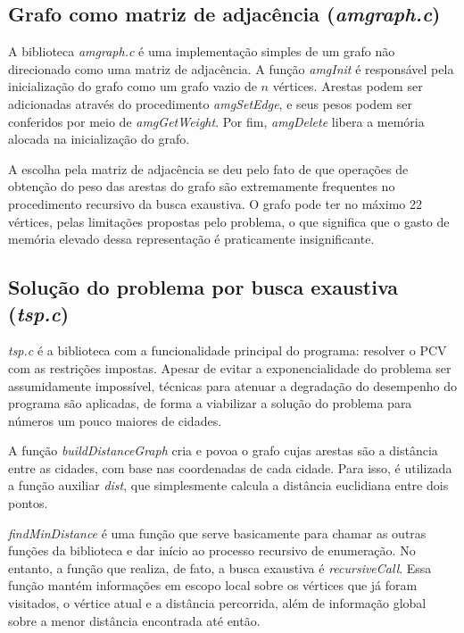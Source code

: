 \documentclass[10pt,a4paper]{article}
\numberwithin{equation}{section}
\begin{document}
\subsection{Grafo como matriz de adjacência (\emph{amgraph.c})}

A biblioteca \emph{amgraph.c} é uma implementação simples de um grafo não direcionado como uma matriz de adjacência. A função \emph{amgInit} é responsável pela inicialização do grafo como um grafo vazio de $n$ vértices. Arestas podem ser adicionadas através do procedimento \emph{amgSetEdge}, e seus pesos podem ser conferidos por meio de \emph{amgGetWeight}. Por fim, \emph{amgDelete} libera a memória alocada na inicialização do grafo.

A escolha pela matriz de adjacência se deu pelo fato de que operações de obtenção do peso das arestas do grafo são extremamente frequentes no procedimento recursivo da busca exaustiva. O grafo pode ter no máximo 22 vértices, pelas limitações propostas pelo problema, o que significa que o gasto de memória elevado dessa representação é praticamente insignificante.

\subsection{Solução do problema por busca exaustiva (\emph{tsp.c})}

\emph{tsp.c} é a biblioteca com a funcionalidade principal do programa: resolver o PCV com as restrições impostas. Apesar de evitar a exponencialidade do problema ser assumidamente impossível, técnicas para atenuar a degradação do desempenho do programa são aplicadas, de forma a viabilizar a solução do problema para números um pouco maiores de cidades.

A função \emph{buildDistanceGraph} cria e povoa o grafo cujas arestas são a distância entre as cidades, com base nas coordenadas de cada cidade. Para isso, é utilizada a função auxiliar \emph{dist}, que simplesmente calcula a distância euclidiana entre dois pontos.

\emph{findMinDistance} é uma função que serve basicamente para chamar as outras funções da biblioteca e dar início ao processo recursivo de enumeração. No entanto, a função que realiza, de fato, a busca exaustiva é \emph{recursiveCall}. Essa função mantém informações em escopo local sobre os vértices que já foram visitados, o vértice atual e a distância percorrida, além de informação global sobre a menor distância encontrada até então.
\end{document}
